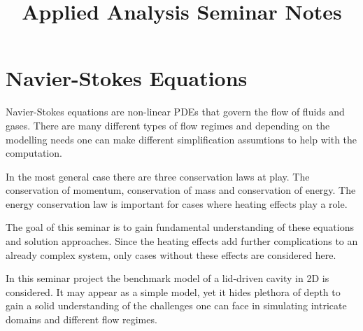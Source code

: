 \documentclass[a4paper, 11pt]{article}
\title{
  {Applied Analysis Seminar Notes}
  }
\begin{document}
\maketitle
\section{Navier-Stokes Equations}
Navier-Stokes equations are non-linear PDEs that govern the flow of fluids
and gases. There are many different types of flow regimes and depending on the modelling
needs one can make different simplification assumtions to help with the computation.

In the most general case there are three conservation laws at play. The conservation of
momentum, conservation of mass and conservation of energy. The energy conservation law is
important for cases where heating effects play a role.

The goal of this seminar is to gain fundamental understanding of these equations and solution
approaches. Since the heating effects add further complications to an already complex system,
only cases without these effects are considered here.

In this seminar project the benchmark model of a lid-driven cavity in 2D is considered.
It may appear as a simple model, yet it hides plethora of depth to gain a solid understanding
of the challenges one can face in simulating intricate domains and different flow regimes.
\end{document}
